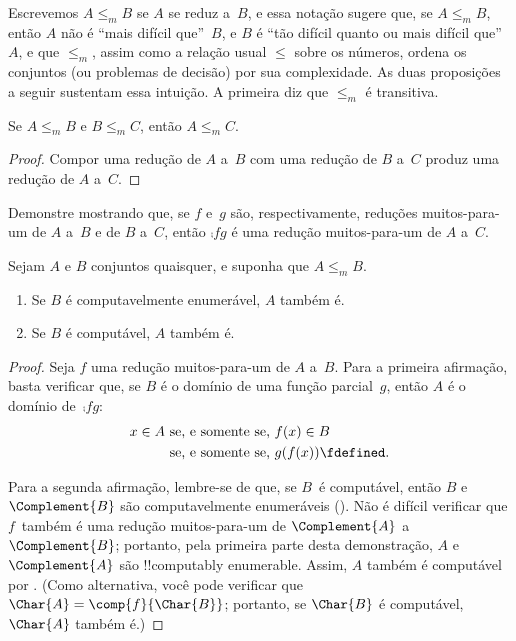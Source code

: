 \documentclass[../../../include/open-logic-section]{subfiles}
\begin{document}

Escrevemos $A \leq_m B$ se $A$ se reduz a~$B$, e essa notação sugere
que, se $A \leq_m B$, então $A$ não é ``mais difícil que''~$B$, e
$B$ é ``tão difícil quanto ou mais difícil que''~$A$, e que
$\le_m$, assim como a relação usual $\le$ sobre os números, ordena os
conjuntos (ou problemas de decisão) por sua complexidade. As duas
proposições a seguir sustentam essa intuição. A primeira diz que
$\le_m$ é transitiva.

\begin{prop}
Se $A \leq_m B$ e $B \leq_m C$, então $A \leq_m C$.
\end{prop}

\begin{proof}
Compor uma redução de $A$ a~$B$ com uma redução de $B$ a~$C$ produz
uma redução de $A$ a~$C$.
\end{proof}

\begin{prob}
Demonstre  mostrando que, se $f$ e~$g$ são,
respectivamente, reduções muitos-para-um de $A$ a~$B$ e de $B$ a~$C$,
então $\comp{f}{g}$ é uma redução muitos-para-um de $A$ a~$C$.
\end{prob}

\begin{prop}
Sejam $A$ e $B$ conjuntos quaisquer, e suponha que $A \leq_m B$.
\begin{enumerate}
\item Se $B$ é computavelmente enumerável, $A$ também é.
\item Se $B$ é computável, $A$ também é.
\end{enumerate}
\end{prop}

\begin{proof}
Seja $f$ uma redução muitos-para-um de $A$ a~$B$. Para a primeira
afirmação, basta verificar que, se $B$ é o domínio de uma função
parcial~$g$, então $A$ é o domínio de~$\comp{f}{g}$:
\begin{align*}
x \in A & \text{ se, e somente se, } f(x) \in B \\
& \text{ se, e somente se, }  g(f(x)) \fdefined.
\end{align*}

Para a segunda afirmação, lembre-se de que, se $B$~é computável, então
$B$ e~$\Complement{B}$ são computavelmente enumeráveis
(). Não é difícil verificar que $f$~também é
uma redução muitos-para-um de $\Complement{A}$ a $\Complement{B}$;
portanto, pela primeira parte desta demonstração, $A$
e~$\Complement{A}$ são !!{computably
enumerable}. Assim, $A$ também é
computável por . (Como alternativa, você pode
verificar que $\Char{A} = \comp{f}{\Char{B}}$; portanto, se
$\Char{B}$ é computável, $\Char{A}$ também é.)
\end{proof}
\end{document}
